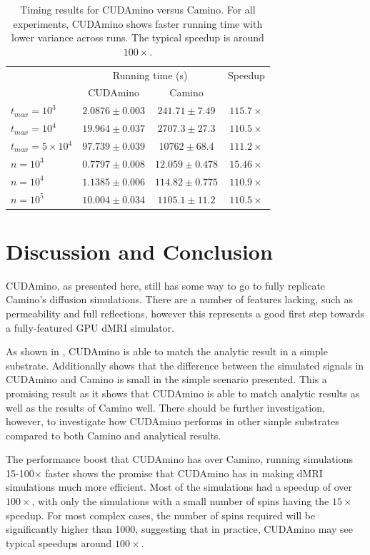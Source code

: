 \begin{table}
  \centering
  \begin{tabular}{lccc}
    \hline
    &\multicolumn{2}{c}{Running time (s)} & Speedup\\
    & CUDAmino & Camino \\\hline
     $t_{max}=10^3$ & $2.0876 \pm 0.003$ & $241.71 \pm 7.49$ & $115.7\times$\\
    $t_{max}=10^4$ & $19.964 \pm 0.037$ & $2707.3 \pm 27.3$ & $110.5\times$\\
    $t_{max}=5\times10^4$ & $97.739 \pm 0.039$ & $10762 \pm 68.4$ & $111.2\times$\\\rule{0pt}{3ex}
    $n=10^3$ & $0.7797 \pm 0.008$ & $12.059 \pm 0.478$ & $15.46\times$\\
    $n=10^4$ & $1.1385 \pm 0.006$ & $114.82 \pm 0.775$ & $110.9\times$\\
    $n=10^5$ & $10.004 \pm 0.034$ & $1105.1 \pm 11.2$ & $110.5\times$\\\hline
  \end{tabular}
  \caption[Timing results for CUDAmino versus Camino.]{Timing results for CUDAmino versus Camino. For all experiments, CUDAmino shows faster running time with lower variance across runs. The typical speedup is around $100\times$.}
  \label{tab:cuboid_timing}
\end{table}

    

\section{Discussion and Conclusion}
\label{sec:cudamino_discussion}
CUDAmino, as presented here, still has some way to go to fully replicate Camino's diffusion simulations.
There are a number of features lacking, such as permeability and full reflections, however this represents a good first step towards a fully-featured GPU \ac{dMRI} simulator.

As shown in , CUDAmino is able to match the analytic result in a simple substrate. Additionally  shows that  the difference between the simulated signals in CUDAmino and Camino is small in the simple scenario presented.
This a promising result as it shows that CUDAmino is able to match analytic results as well as the results of Camino well.
There should be further investigation, however, to investigate how CUDAmino performs in other simple substrates compared to both Camino and analytical results. 

The performance boost that CUDAmino has over Camino, running simulations 15-100$\times$ faster shows the promise that CUDAmino has in making \ac{dMRI} simulations much more efficient.
Most of the simulations had a speedup of over $100\times$, with only the simulations with a small number of spins having the $15\times$ speedup.
For most complex cases, the number of spins required will be significantly higher than 1000, suggesting that in practice, CUDAmino may see typical speedups around $100\times$.

